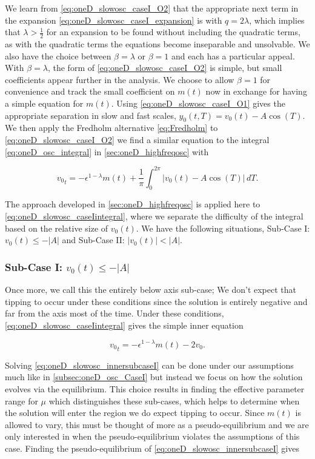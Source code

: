 We learn from \eqref{eq:oneD_slowosc_caseI_O2} that the appropriate next term in the expansion \eqref{eq:oneD_slowosc_caseI_expansion} is with $q= 2\lambda$, which implies that $\lambda> \frac{1}{2}$ for an expansion to be found without including the quadratic terms, as with the quadratic terms the equations become inseparable and unsolvable. We also have the choice between $\beta=\lambda$ or $\beta=1$ and each has a particular appeal. With $\beta=\lambda$, the form of \eqref{eq:oneD_slowosc_caseI_O2} is simple, but small coefficients appear further in the analysis. We choose to allow $\beta=1$ for convenience and track the small coefficient on $m(t)$ now in exchange for having a simple equation for $m(t)$. Using \eqref{eq:oneD_slowosc_caseI_O1} gives the appropriate separation in slow and fast scales, $y_0(t,T)=v_0(t)-A\cos(T)$. We then apply the Fredholm alternative \eqref{eq:Fredholm} to \eqref{eq:oneD_slowosc_caseI_O2} we find a similar equation to the integral \eqref{eq:oneD_osc_integral} in \autoref{sec:oneD_highfreqosc} with

\begin{equation}\label{eq:oneD_slowosc_caseIintegral}
{v_0}_t = -\epsilon^{1-\lambda}m(t)+\frac{1}{\pi}\int_0^{2\pi} |v_0(t)-A\cos(T)|\,dT.
\end{equation}

The approach developed in \autoref{sec:oneD_highfreqosc} is applied here to \eqref{eq:oneD_slowosc_caseIintegral}, where we separate the difficulty of the integral based on the relative size of $v_0(t)$. We have the following situations, Sub-Case I: $v_0(t)\le -|A|$ and Sub-Case II: $|v_0(t)|<|A|$.

\subsubsection{Sub-Case I: $v_0(t) \le -|A|$} 
\label{subsubsec:oneD_slowosc_subcaseI}

Once more, we call this the entirely below axis sub-case; We don't expect that tipping to occur under these conditions since the solution is entirely negative and far from the axis most of the time. Under these conditions, \eqref{eq:oneD_slowosc_caseIintegral} gives the simple inner equation

\begin{equation}\label{eq:oneD_slowosc_innersubcaseI}
{v_0}_t= -\epsilon^{1-\lambda}m(t)-2v_0.
\end{equation}

Solving \eqref{eq:oneD_slowosc_innersubcaseI} can be done under our assumptions much like in \autoref{subsec:oneD_osc_CaseI} but instead we focus on how the solution evolves via the equilibrium. This choice results in finding the effective parameter range for $\mu$ which distinguishes these sub-cases, which helps to determine when the solution will enter the region we do expect tipping to occur. Since $m(t)$ is allowed to vary, this must be thought of more as a pseudo-equilibrium and we are only interested in when the pseudo-equilibrium violates the assumptions of this case. Finding the pseudo-equilibrium of \eqref{eq:oneD_slowosc_innersubcaseI} gives

